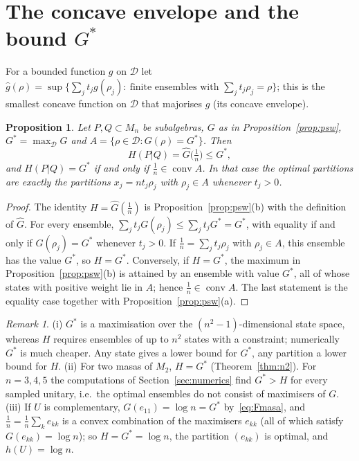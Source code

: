 \documentclass[11pt]{article}
\DeclareMathOperator{\conv}{conv}
\newcommand{\D}{\mathcal{D}}
\theoremstyle{plain}
\newtheorem{proposition}[theorem]{Proposition}
\theoremstyle{definition}
\theoremstyle{remark}
\newtheorem{remark}[theorem]{Remark}
\begin{document}
\section{The concave envelope and the bound \texorpdfstring{$G^*$}{G*}}\label{sec:envelope}

For a bounded function $g$ on $\D$ let $\hat g(\rho)=\sup\{\sum_jt_jg(\rho_j):\ \text{finite ensembles with }\sum_jt_j\rho_j=\rho\}$;
this is the smallest concave function on $\D$ that majorises $g$ (its concave envelope).

\begin{proposition}\label{prop:envelope}
Let $P,Q\subset M_n$ be subalgebras, $G$ as in Proposition~\ref{prop:psw}, $G^*=\max_\D G$ and $A=\{\rho\in\D:G(\rho)=G^*\}$.
Then
\[
  H(P|Q)=\hat G\bigl(\tfrac1n\bigr)\le G^*,
\]
and $H(P|Q)=G^*$ if and only if $\frac1n\in\conv A$. In that case the optimal partitions are exactly the partitions
$x_j=nt_j\rho_j$ with $\rho_j\in A$ whenever $t_j>0$.
\end{proposition}
\begin{proof}
The identity $H=\hat G(\frac1n)$ is Proposition~\ref{prop:psw}(b) with the definition of $\hat G$. For every ensemble,
$\sum_jt_jG(\rho_j)\le\sum_jt_jG^*=G^*$, with equality if and only if $G(\rho_j)=G^*$ whenever $t_j>0$. If $\frac1n=\sum_jt_j\rho_j$
with $\rho_j\in A$, this ensemble has the value $G^*$, so $H=G^*$. Conversely, if $H=G^*$, the maximum in
Proposition~\ref{prop:psw}(b) is attained by an ensemble with value $G^*$, all of whose states with positive weight lie in
$A$; hence $\frac1n\in\conv A$. The last statement is the equality case together with Proposition~\ref{prop:psw}(a).
\end{proof}

\begin{remark}\label{rem:envelope}
(i) $G^*$ is a maximisation over the $(n^2-1)$-dimensional state space, whereas $H$ requires ensembles of up to $n^2$ states
with a constraint; numerically $G^*$ is much cheaper. Any state gives a lower bound for $G^*$, any partition a lower bound
for $H$.
(ii) For two masas of $M_2$, $H=G^*$ (Theorem~\ref{thm:n2}). For $n=3,4,5$ the computations of Section~\ref{sec:numerics}
find $G^*>H$ for every sampled unitary, i.e.\ the optimal ensembles do not consist of maximisers of $G$.
(iii) If $U$ is complementary, $G(e_{11})=\log n=G^*$ by~\eqref{eq:Fmasa}, and $\frac1n=\frac1n\sum_ke_{kk}$ is a convex
combination of the maximisers $e_{kk}$ (all of which satisfy $G(e_{kk})=\log n$); so $H=G^*=\log n$, the partition
$(e_{kk})$ is optimal, and $h(U)=\log n$.
\end{remark}
\end{document}
